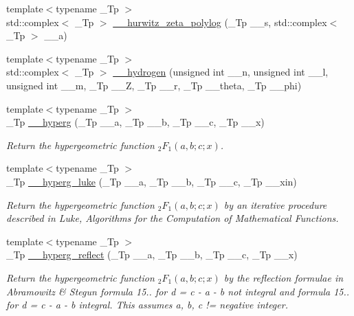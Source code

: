 \begin{DoxyCompactItemize}
{\footnotesize template$<$typename \+\_\+\+Tp $>$ }\\std\+::complex$<$ \+\_\+\+Tp $>$ \hyperlink{namespacestd_1_1____detail_a7c45415c3ec0e137eea2364a6dd3af4e}{\+\_\+\+\_\+hurwitz\+\_\+zeta\+\_\+polylog} (\+\_\+\+Tp \+\_\+\+\_\+s, std\+::complex$<$ \+\_\+\+Tp $>$ \+\_\+\+\_\+a)
\item 
{\footnotesize template$<$typename \+\_\+\+Tp $>$ }\\std\+::complex$<$ \+\_\+\+Tp $>$ \hyperlink{namespacestd_1_1____detail_aba60bcf9f002dc900042065999546bc9}{\+\_\+\+\_\+hydrogen} (unsigned int \+\_\+\+\_\+n, unsigned int \+\_\+\+\_\+l, unsigned int \+\_\+\+\_\+m, \+\_\+\+Tp \+\_\+\+\_\+Z, \+\_\+\+Tp \+\_\+\+\_\+r, \+\_\+\+Tp \+\_\+\+\_\+theta, \+\_\+\+Tp \+\_\+\+\_\+phi)
\item 
{\footnotesize template$<$typename \+\_\+\+Tp $>$ }\\\+\_\+\+Tp \hyperlink{namespacestd_1_1____detail_a316589a60d5e5f50201c2d42b980678c}{\+\_\+\+\_\+hyperg} (\+\_\+\+Tp \+\_\+\+\_\+a, \+\_\+\+Tp \+\_\+\+\_\+b, \+\_\+\+Tp \+\_\+\+\_\+c, \+\_\+\+Tp \+\_\+\+\_\+x)
\begin{DoxyCompactList}\small\item\em Return the hypergeometric function $ {}_2F_1(a,b;c;x) $. \end{DoxyCompactList}\item 
{\footnotesize template$<$typename \+\_\+\+Tp $>$ }\\\+\_\+\+Tp \hyperlink{namespacestd_1_1____detail_a0c1ec62b5c39c93ad70a8229a7a6d84d}{\+\_\+\+\_\+hyperg\+\_\+luke} (\+\_\+\+Tp \+\_\+\+\_\+a, \+\_\+\+Tp \+\_\+\+\_\+b, \+\_\+\+Tp \+\_\+\+\_\+c, \+\_\+\+Tp \+\_\+\+\_\+xin)
\begin{DoxyCompactList}\small\item\em Return the hypergeometric function $ {}_2F_1(a,b;c;x) $ by an iterative procedure described in Luke, Algorithms for the Computation of Mathematical Functions. \end{DoxyCompactList}\item 
{\footnotesize template$<$typename \+\_\+\+Tp $>$ }\\\+\_\+\+Tp \hyperlink{namespacestd_1_1____detail_a3c3baddc93bfaf1cb368d4b74e53542d}{\+\_\+\+\_\+hyperg\+\_\+reflect} (\+\_\+\+Tp \+\_\+\+\_\+a, \+\_\+\+Tp \+\_\+\+\_\+b, \+\_\+\+Tp \+\_\+\+\_\+c, \+\_\+\+Tp \+\_\+\+\_\+x)
\begin{DoxyCompactList}\small\item\em Return the hypergeometric function $ {}_2F_1(a,b;c;x) $ by the reflection formulae in Abramowitz \& Stegun formula 15.. for d = c -\/ a -\/ b not integral and formula 15.. for d = c -\/ a -\/ b integral. This assumes a, b, c != negative integer. \end{DoxyCompactList}\item 

\end{DoxyCompactItemize}
